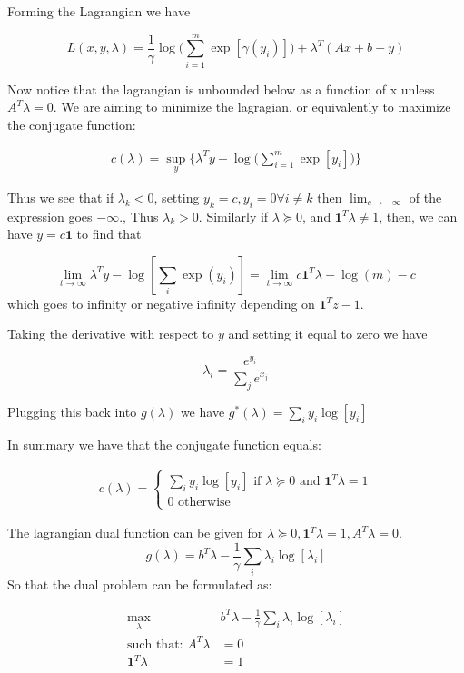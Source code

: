 \documentclass[answers]{exam} %
\newcommand{\B}[1]{\mathbf{#1}}
\begin{document}
\begin{itemize}
\begin{framed}
Forming the Lagrangian we have

\[
L(x,y,\lambda) = \frac{1}{\gamma} \log \big(  \sum_{i=1}^{m} \exp[\gamma(y_i)] \big) + \lambda^T(Ax + b - y)
\]

Now notice that the lagrangian is unbounded below as a function of x unless $A^{T} \lambda =0$. We are aiming to minimize the lagragian,
or equivalently to maximize the conjugate function:

\begin{gather*}
c(\lambda) = \sup_{y}\{ \lambda^Ty - \log \big(  \sum_{i=1}^{m} \exp[y_i] \big) \}
\end{gather*}

Thus we see that if $\lambda_k < 0$, setting $y_k = c, y_i = 0 \forall i \neq k$ then $\lim_{c \to - \infty}$ of the expression goes $- \infty.$, Thus $\lambda_k > 0$. Similarly if $\lambda \succeq 0$, and $\B{1}^T \lambda \neq 1$, then, we can have $y = c \B{1}$ to find that

\[
\lim_{t \to \infty} \lambda^{T}y - \log[\sum_{i} \exp(y_i)] = \lim_{t \to \infty} c \B{1}^{T} \lambda - \log(m) - c
\]
which goes to infinity or negative infinity depending on $\B{1}^T z - 1$. 

Taking the derivative with respect to $y$ and setting it equal to zero we have

\[
\lambda_i = \frac{e^{y_i}}{ \sum_{j} e^{x_j}}
\]

Plugging this back into $g(\lambda)$ we have $g^*(\lambda) = \sum_{i} y_i \log[y_i]$

In summary we have that the conjugate function equals:

\begin{gather*}
c(\lambda) = \begin{cases}\sum_{i} y_i \log[y_i] \mbox{  if } \lambda \succeq 0 \mbox{ and } \B{1}^T \lambda = 1 \\ 
0 \mbox{ otherwise } \end{cases}
\end{gather*}

The lagrangian dual function can be given for $\lambda \succeq  0, \B{1}^{T}\lambda = 1, A^{T}\lambda = 0$. 
\[
g(\lambda) = b^{T} \lambda - \frac{1}{\gamma}\sum_{i} \lambda_i \log[\lambda_i]
\]
So that the dual problem can be formulated as:

\begin{equation*}
\begin{aligned}
\max_{\lambda} \quad & b^T \lambda - \frac{1}{\gamma} \sum_{i} \lambda_i \log[\lambda_i] \\ 
\mbox{such that: }  A^{T} \lambda &= 0 \\ 
\B{1}^{T}\lambda &= 1 \\ 
\end{aligned}
\end{equation*}


\end{framed}
\end{itemize}
\end{document}
